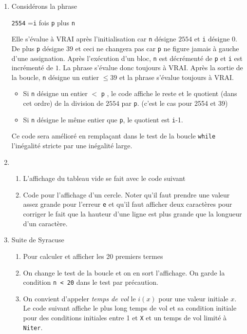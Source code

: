 \begin{enumerate}
\item Considérons la phrase
\begin{center}
  \og \texttt{2554} =\texttt{i} fois \texttt{p} plus \texttt{n} \fg
\end{center}
Elle s'évalue à VRAI après l'initialisation car \texttt{n} désigne $2554$ et \texttt{i} désigne $0$. De plus \texttt{p} désigne 39 et ceci ne changera pas car \texttt{p} ne figure jamais à gauche d'une assignation.\newline
Après l'exécution d'un bloc, \texttt{n} est décrémenté de \texttt{p} et \texttt{i} est incrémenté de $1$. La phrase s'évalue donc toujours à VRAI.\newline
Après la sortie de la boucle, \texttt{n} désigne un entier $\leq 39$ et la phrase s'évalue toujours à VRAI.
\begin{itemize}
  \item Si \texttt{n} désigne un entier $<$ \texttt{p} , le code affiche le reste et le quotient (dans cet ordre) de la division de $2554$ par \texttt{p}. (c'est le cas pour 2554 et 39)
  \item Si \texttt{n} désigne le même entier que \texttt{p}, le quotient est \texttt{i}-1. 
\end{itemize}
Ce code sera amélioré en remplaçant dans le test de la boucle \texttt{while} l'inégalité stricte par une inégalité large.

\item
\begin{enumerate}
  \item L'affichage du tableau vide se fait avec le code suivant


  \item Code pour l'affichage d'un cercle. Noter qu'il faut prendre une valeur assez grande pour l'erreur \texttt{e} et qu'il faut afficher deux caractères pour corriger le fait que la hauteur d'une ligne est plus grande que la longueur d'un caractère.

\end{enumerate}


\item Suite de Syracuse
\begin{enumerate}
  \item Pour calculer et afficher les 20 premiers termes

  
  \item On change le test de la boucle et on en sort l'affichage. On garde la condition \texttt{n < 20} dans le test par précaution.

  \item On convient d'appeler \emph{temps de vol} le $i(x)$ pour une valeur initiale $x$. Le code suivant affiche le plus long temps de vol et sa condition initiale pour des conditions initiales entre 1 et \texttt{X} et un temps de vol limité à \texttt{Niter}. 

\end{enumerate}



\end{enumerate}
